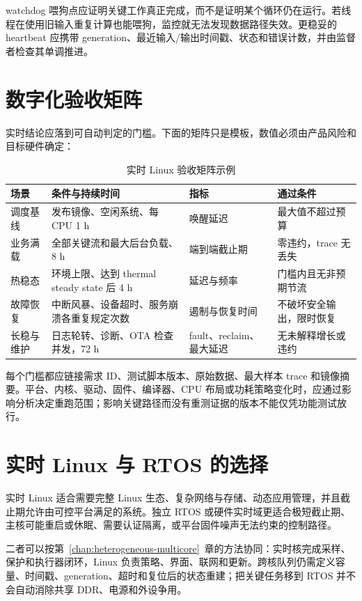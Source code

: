 watchdog 喂狗点应证明关键工作真正完成，而不是证明某个循环仍在运行。若线程在使用旧输入重复计算也能喂狗，监控就无法发现数据路径失效。更稳妥的 heartbeat 应携带 generation、最近输入/输出时间戳、状态和错误计数，并由监督者检查其单调推进。

\section{数字化验收矩阵}

实时结论应落到可自动判定的门槛。下面的矩阵只是模板，数值必须由产品风险和目标硬件确定：

\begin{table}[H]
  \centering
  \caption{实时 Linux 验收矩阵示例}
  \begin{tabular}{p{31mm}p{45mm}p{27mm}p{29mm}}
    \hline
    场景 & 条件与持续时间 & 指标 & 通过条件 \\
    \hline
    调度基线 & 发布镜像、空闲系统、每 CPU 1 h & 唤醒延迟 & 最大值不超过预算 \\
    业务满载 & 全部关键流和最大后台负载、8 h & 端到端截止期 & 零违约，trace 无丢失 \\
    热稳态 & 环境上限、达到 thermal steady state 后 4 h & 延迟与频率 & 门槛内且无非预期节流 \\
    故障恢复 & 中断风暴、设备超时、服务崩溃各重复规定次数 & 遏制与恢复时间 & 不破坏安全输出，限时恢复 \\
    长稳与维护 & 日志轮转、诊断、OTA 检查并发，72 h & fault、reclaim、最大延迟 & 无未解释增长或违约 \\
    \hline
  \end{tabular}
\end{table}

每个门槛都应链接需求 ID、测试脚本版本、原始数据、最大样本 trace 和镜像摘要。平台、内核、驱动、固件、编译器、CPU 布局或功耗策略变化时，应通过影响分析决定重跑范围；影响关键路径而没有重测证据的版本不能仅凭功能测试放行。

\section{实时 Linux 与 RTOS 的选择}

实时 Linux 适合需要完整 Linux 生态、复杂网络与存储、动态应用管理，并且截止期允许由可控平台满足的系统。独立 RTOS 或硬件实时域更适合极短截止期、主核可能重启或休眠、需要认证隔离，或平台固件噪声无法约束的控制路径。

二者可以按\mbox{第~\ref{chap:heterogeneous-multicore}~章}的方法协同：实时核完成采样、保护和执行器闭环，Linux 负责策略、界面、联网和更新。跨核队列仍需定义容量、时间戳、generation、超时和复位后的状态重建；把关键任务移到 RTOS 并不会自动消除共享 DDR、电源和外设争用。

